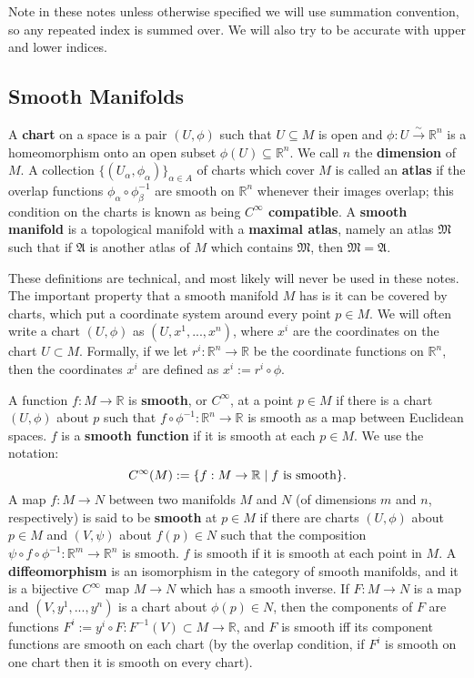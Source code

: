 Note in these notes unless otherwise specified we will use summation convention, so any repeated index is summed over. 
We will also try to be accurate with upper and lower indices. 

\subsection{Smooth Manifolds}

A \textbf{chart} on a space is a pair $(U, \phi)$ 
such that $U\subseteq M$ is open and $\phi : U\xrightarrow{\sim}\mathbb R^n$ is a homeomorphism onto an open subset 
$\phi(U)\subseteq\mathbb R^n$. We call $n$ the 
\textbf{dimension} of $M$. A collection $\{(U_\alpha, \phi_\alpha)\}_{\alpha\in A}$ of charts which cover $M$ is called an 
\textbf{atlas} if the overlap functions $\phi_\alpha\circ\phi_\beta^{-1}$ are smooth on $\mathbb R^n$ whenever their images 
overlap; this condition on the charts is known as being \textbf{$C^\infty$ compatible}. A \textbf{smooth manifold} is a topological 
manifold with a \textbf{maximal atlas}, namely an atlas $\mathfrak M$ such that if $\mathfrak A$ is another atlas of $M$ which 
contains $\mathfrak M$, then $\mathfrak M = \mathfrak A$. 

These definitions are technical, and most likely will never be used in these notes. The important property that a smooth manifold 
$M$ has is it can be covered by charts, which put a coordinate system around every point $p\in M$. We will often write a chart 
$(U, \phi)$ as $(U, x^1, ..., x^n)$, where $x^i$ are the coordinates on the chart $U\subset M$. Formally, if we let $r^i : \mathbb 
R^n\rightarrow\mathbb R$ be the coordinate functions on $\mathbb R^n$, then the coordinates $x^i$ are defined as 
$x^i := r^i\circ\phi$. 

A function $f : M\rightarrow\mathbb R$ is \textbf{smooth}, or $C^\infty$, at a point $p\in M$ if there is a chart $(U, \phi)$ about 
$p$ such that $f\circ \phi^{-1} : \mathbb R^n\rightarrow\mathbb R$ is smooth as a map between Euclidean spaces. $f$ is a 
\textbf{smooth function} if it is smooth at each $p\in M$. We use the notation:
\begin{equation}
	C^\infty(M) := \{ f : M\rightarrow\mathbb R \; | \; f \textnormal{ is smooth}\}.
\end{equation}
A map $f : M\rightarrow N$ between two manifolds $M$ and $N$ (of dimensions $m$ and $n$, respectively) is said to be 
\textbf{smooth} at $p\in M$ if there are charts $(U, \phi)$ about $p\in M$ and $(V, \psi)$ about $f(p)\in N$ such that the 
composition $\psi\circ f\circ\phi^{-1} : \mathbb R^m\rightarrow\mathbb R^n$ is smooth. $f$ is smooth if it is smooth at each point 
in $M$. A \textbf{diffeomorphism} is an isomorphism in the category of smooth manifolds, and it is a bijective $C^\infty$ map $M
\rightarrow N$ which has a smooth inverse. If $F : M\rightarrow N$ is a map and $(V, y^1, ..., y^n)$ is a chart about $\phi(p)\in 
N$, then the components of $F$ are functions $F^i := y^i\circ F : F^{-1}(V)\subset M\rightarrow\mathbb R$, and $F$ is 
smooth iff its component functions are smooth on each chart (by the overlap condition, if $F^i$ is smooth on one chart then it 
is smooth on every chart). 

